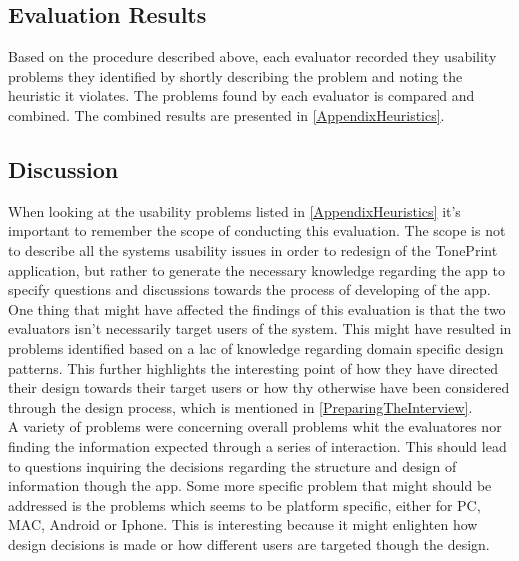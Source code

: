\subsection{Evaluation Results}
\label{Heuristic_Results}
Based on the procedure described above, each evaluator recorded they usability problems they identified by shortly describing the problem and noting the heuristic it violates. The problems found by each evaluator is compared and combined. The combined results are presented in \autoref{AppendixHeuristics}. 

\subsection{Discussion}
\label{HeuristicDiscussion}
When looking at the usability problems listed in \autoref{AppendixHeuristics} it's important to remember the scope of conducting this evaluation. The scope is not to describe all the systems usability issues in order to redesign of the TonePrint application, but rather to generate the necessary knowledge regarding the app to specify questions and discussions towards the process of developing of the app. \\
One thing that might have affected the findings of this evaluation is that the two evaluators isn't necessarily target users of the system. This might have resulted in problems identified based on a lac of knowledge regarding domain specific design patterns. This further highlights the interesting point of how they have directed their design towards their target users or how thy otherwise have been considered through the design process, which is mentioned in \autoref{PreparingTheInterview}.\\
A variety of problems were concerning overall problems whit the evaluatores nor finding the information expected through a series of interaction. This should lead to questions inquiring the decisions regarding the structure and design of information though the app. 
Some more specific problem that might should be addressed is the problems which seems to be platform specific, either for PC, MAC, Android or Iphone. This is interesting because it might enlighten how design decisions is made or how different users are targeted though the design.






